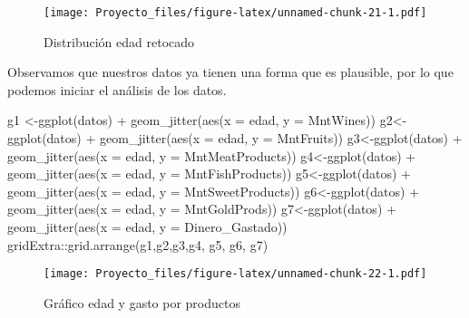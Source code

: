 \documentclass[
]{article}
\newenvironment{Shaded}{\begin{snugshade}}{\end{snugshade}}
\newcommand{\AttributeTok}[1]{\textcolor[rgb]{0.77,0.63,0.00}{#1}}
\newcommand{\FunctionTok}[1]{\textcolor[rgb]{0.00,0.00,0.00}{#1}}
\newcommand{\NormalTok}[1]{#1}
\newcommand{\OtherTok}[1]{\textcolor[rgb]{0.56,0.35,0.01}{#1}}
\newcommand{\SpecialCharTok}[1]{\textcolor[rgb]{0.00,0.00,0.00}{#1}}
\begin{document}
\begin{figure}
\centering
\texttt{[image: Proyecto\_files/figure-latex/unnamed-chunk-21-1.pdf]}
\caption{Distribución edad retocado}
\end{figure}

Observamos que nuestros datos ya tienen una forma que es plausible, por
lo que podemos iniciar el análisis de los datos.

\begin{Shaded}
\begin{Highlighting}[]
\NormalTok{g1 }\OtherTok{\textless{}{-}}\FunctionTok{ggplot}\NormalTok{(datos) }\SpecialCharTok{+} 
  \FunctionTok{geom\_jitter}\NormalTok{(}\FunctionTok{aes}\NormalTok{(}\AttributeTok{x =}\NormalTok{ edad, }\AttributeTok{y =}\NormalTok{ MntWines))}
\NormalTok{g2}\OtherTok{\textless{}{-}}\FunctionTok{ggplot}\NormalTok{(datos) }\SpecialCharTok{+} 
  \FunctionTok{geom\_jitter}\NormalTok{(}\FunctionTok{aes}\NormalTok{(}\AttributeTok{x =}\NormalTok{ edad, }\AttributeTok{y =}\NormalTok{ MntFruits))}
\NormalTok{g3}\OtherTok{\textless{}{-}}\FunctionTok{ggplot}\NormalTok{(datos) }\SpecialCharTok{+} 
  \FunctionTok{geom\_jitter}\NormalTok{(}\FunctionTok{aes}\NormalTok{(}\AttributeTok{x =}\NormalTok{ edad, }\AttributeTok{y =}\NormalTok{ MntMeatProducts))}
\NormalTok{g4}\OtherTok{\textless{}{-}}\FunctionTok{ggplot}\NormalTok{(datos) }\SpecialCharTok{+} 
  \FunctionTok{geom\_jitter}\NormalTok{(}\FunctionTok{aes}\NormalTok{(}\AttributeTok{x =}\NormalTok{ edad, }\AttributeTok{y =}\NormalTok{ MntFishProducts))}
\NormalTok{g5}\OtherTok{\textless{}{-}}\FunctionTok{ggplot}\NormalTok{(datos) }\SpecialCharTok{+} 
  \FunctionTok{geom\_jitter}\NormalTok{(}\FunctionTok{aes}\NormalTok{(}\AttributeTok{x =}\NormalTok{ edad, }\AttributeTok{y =}\NormalTok{ MntSweetProducts))}
\NormalTok{g6}\OtherTok{\textless{}{-}}\FunctionTok{ggplot}\NormalTok{(datos) }\SpecialCharTok{+} 
  \FunctionTok{geom\_jitter}\NormalTok{(}\FunctionTok{aes}\NormalTok{(}\AttributeTok{x =}\NormalTok{ edad, }\AttributeTok{y =}\NormalTok{ MntGoldProds))}
\NormalTok{g7}\OtherTok{\textless{}{-}}\FunctionTok{ggplot}\NormalTok{(datos) }\SpecialCharTok{+} 
  \FunctionTok{geom\_jitter}\NormalTok{(}\FunctionTok{aes}\NormalTok{(}\AttributeTok{x =}\NormalTok{ edad, }\AttributeTok{y =}\NormalTok{ Dinero\_Gastado))}
\NormalTok{gridExtra}\SpecialCharTok{::}\FunctionTok{grid.arrange}\NormalTok{(g1,g2,g3,g4, g5, g6, g7)}
\end{Highlighting}
\end{Shaded}

\begin{figure}
\centering
\texttt{[image: Proyecto\_files/figure-latex/unnamed-chunk-22-1.pdf]}
\caption{Gráfico edad y gasto por productos}
\end{figure}
\end{document}
